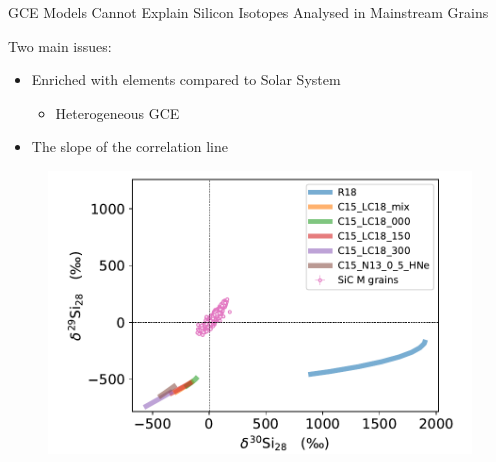 \documentclass[10pt]{beamer}
\begin{document}
\begin{frame}{GCE Models Cannot Explain Silicon Isotopes Analysed in Mainstream Grains}
    \begin{minipage}{4.5cm}
    
    Two main issues:\\


    \begin{itemize}
    \setlength\itemsep{2em}
        \item Enriched with  elements compared to Solar System
        \begin{itemize}
            \item Heterogeneous GCE 
        \end{itemize}
        \item \alert{The slope of the correlation line}

        
    \end{itemize}
    \end{minipage}
    \begin{minipage}{7cm}
        \begin{figure}
            \centering
            \includegraphics[width=\textwidth]{figs/gce_Si_isotope.pdf}
            
        \end{figure}
    \end{minipage}
    
\end{frame}
\end{document}
